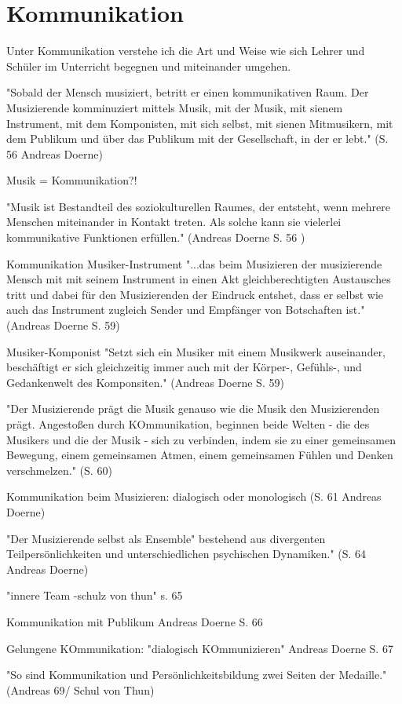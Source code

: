 \section{Kommunikation}

Unter Kommunikation verstehe ich die Art und Weise wie sich Lehrer und Schüler
im Unterricht begegnen und miteinander umgehen. 

"Sobald der Mensch musiziert, betritt er einen kommunikativen Raum. Der
Musizierende komminuziert mittels Musik, mit der Musik, mit sienem Instrument,
mit dem Komponisten, mit sich selbst, mit sienen Mitmusikern, mit dem Publikum
und über das Publikum mit der Gesellschaft, in der er lebt." (S. 56 Andreas
Doerne)

Musik = Kommunikation?! 

"Musik ist Bestandteil des soziokulturellen Raumes, der entsteht, wenn mehrere
Menschen miteinander in Kontakt treten. Als solche kann sie vielerlei
kommunikative Funktionen erfüllen." (Andreas Doerne S. 56 )

Kommunikation Musiker-Instrument
"...das beim Musizieren der musizierende Mensch mit mit seinem Instrument in
einen Akt gleichberechtigten Austausches tritt und dabei für den Musizierenden
der Eindruck entshet, dass er selbst wie auch das Instrument zugleich Sender und
Empfänger von Botschaften ist." (Andreas Doerne S. 59)


Musiker-Komponist
"Setzt sich ein Musiker mit einem Musikwerk auseinander, beschäftigt er sich
gleichzeitig immer auch mit der Körper-, Gefühls-, und Gedankenwelt des
Komponsiten." (Andreas Doerne S. 59)

"Der Musizierende prägt die Musik genauso wie die Musik den Musizierenden prägt.
Angestoßen durch KOmmunikation, beginnen beide Welten - die des Musikers und die
der Musik - sich zu verbinden, indem sie zu einer gemeinsamen Bewegung, einem
gemeinsamen Atmen, einem gemeinsamen Fühlen und Denken verschmelzen." (S. 60)

Kommunikation beim Musizieren: dialogisch oder monologisch (S. 61 Andreas Doerne)


"Der Musizierende selbst als Ensemble" bestehend aus divergenten Teilpersönlichkeiten und
unterschiedlichen psychischen Dynamiken." (S. 64 Andreas Doerne)

"innere Team -schulz von thun" s. 65

Kommunikation mit Publikum Andreas Doerne S. 66

Gelungene KOmmunikation: "dialogisch KOmmunizieren" Andreas Doerne S. 67

"So sind Kommunikation und Persönlichkeitsbildung zwei Seiten der Medaille."
(Andreas 69/ Schul von Thun)
